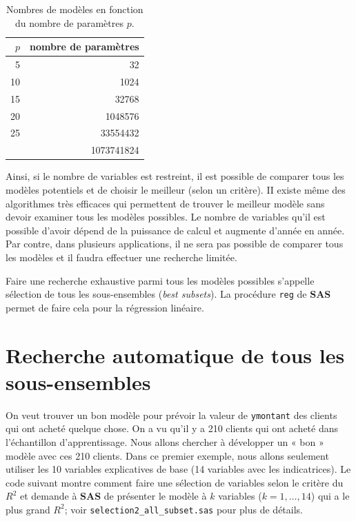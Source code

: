 \documentclass[
  11pt,
  letterpaper,
]{book}
\theoremstyle{definition}
\theoremstyle{definition}
\theoremstyle{definition}
\theoremstyle{remark}
\begin{document}
\begin{table}

\caption{\label{tab:02-table3}Nombres de modèles en fonction du nombre de paramètres $p$.}
\centering
\begin{tabular}[t]{rr}
\toprule
$p$ & nombre de paramètres\\
\midrule
5 & 32\\
10 & 1024\\
15 & 32768\\
20 & 1048576\\
25 & 33554432\\
\addlinespace
30 & 1073741824\\
\bottomrule
\end{tabular}
\end{table}

Ainsi, si le nombre de variables est restreint, il est possible de comparer tous les modèles potentiels et de choisir le meilleur (selon un critère). II existe même des algorithmes très efficaces qui permettent de trouver le meilleur modèle sans devoir examiner tous les modèles possibles. Le nombre de variables qu'il est possible d'avoir dépend de la puissance de calcul et augmente d'année en année. Par contre, dans plusieurs applications, il ne sera pas possible de comparer tous les modèles et il faudra effectuer une recherche limitée.

Faire une recherche exhaustive parmi tous les modèles possibles s'appelle sélection de tous les sous-ensembles (\emph{best subsets}). La procédure \texttt{reg} de \textbf{SAS} permet de faire cela pour la régression linéaire.

\hypertarget{recherche-automatique-de-tous-les-sous-ensembles}{%
\section{Recherche automatique de tous les sous-ensembles}\label{recherche-automatique-de-tous-les-sous-ensembles}}

On veut trouver un bon modèle pour prévoir la valeur de \texttt{ymontant} des clients qui ont acheté quelque chose. On a vu qu'il y a 210 clients qui ont acheté dans l'échantillon d'apprentissage. Nous allons chercher à développer un « bon » modèle avec ces 210 clients. Dans ce premier exemple, nous allons seulement utiliser les 10 variables explicatives de base (14 variables avec les indicatrices). Le code suivant montre comment faire une sélection de variables selon le critère du \(R^2\) et demande à \textbf{SAS} de présenter le modèle à \(k\) variables (\(k=1, \ldots, 14\)) qui a le plus grand \(R^2\); voir \texttt{selection2\_all\_subset.sas} pour plus de détails.
\end{document}
